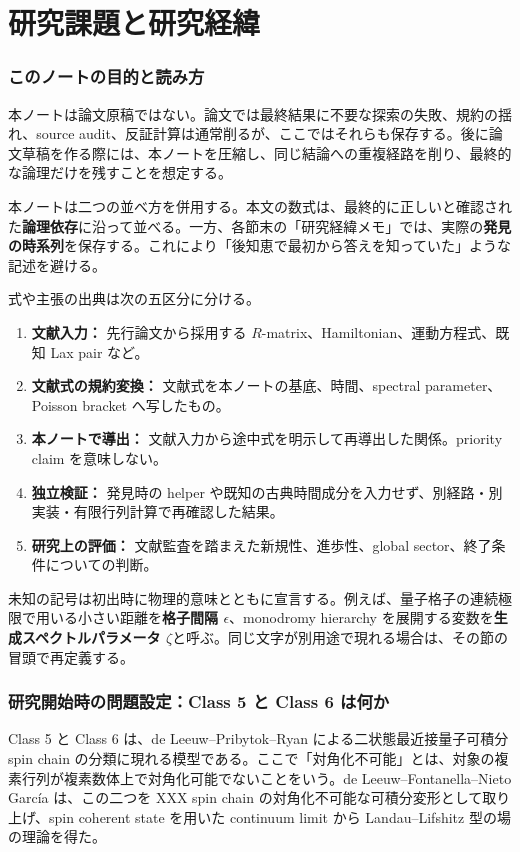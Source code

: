 \part{研究課題と研究経緯}

\section{このノートの目的と読み方}
\label{sec:purpose}
本ノートは論文原稿ではない。論文では最終結果に不要な探索の失敗、規約の揺れ、source audit、反証計算は通常削るが、ここではそれらも保存する。後に論文草稿を作る際には、本ノートを圧縮し、同じ結論への重複経路を削り、最終的な論理だけを残すことを想定する。

本ノートは二つの並べ方を併用する。本文の数式は、最終的に正しいと確認された\textbf{論理依存}に沿って並べる。一方、各節末の「研究経緯メモ」では、実際の\textbf{発見の時系列}を保存する。これにより「後知恵で最初から答えを知っていた」ような記述を避ける。

式や主張の出典は次の五区分に分ける。
\begin{enumerate}[leftmargin=2.5em]
\item \textbf{文献入力：} 先行論文から採用する $R$-matrix、Hamiltonian、運動方程式、既知 Lax pair など。
\item \textbf{文献式の規約変換：} 文献式を本ノートの基底、時間、spectral parameter、Poisson bracket へ写したもの。
\item \textbf{本ノートで導出：} 文献入力から途中式を明示して再導出した関係。priority claim を意味しない。
\item \textbf{独立検証：} 発見時の helper や既知の古典時間成分を入力せず、別経路・別実装・有限行列計算で再確認した結果。
\item \textbf{研究上の評価：} 文献監査を踏まえた新規性、進歩性、global sector、終了条件についての判断。
\end{enumerate}

未知の記号は初出時に物理的意味とともに宣言する。例えば、量子格子の連続極限で用いる小さい距離を\textbf{格子間隔 $\epsilon$}、monodromy hierarchy を展開する変数を\textbf{生成スペクトルパラメータ $\zeta$}と呼ぶ。同じ文字が別用途で現れる場合は、その節の冒頭で再定義する。

\section{研究開始時の問題設定：Class 5 と Class 6 は何か}
Class 5 と Class 6 は、de Leeuw--Pribytok--Ryan による二状態最近接量子可積分 spin chain の分類に現れる模型である\cite{DPR2019}。ここで「対角化不可能」とは、対象の複素行列が複素数体上で対角化可能でないことをいう。de Leeuw--Fontanella--Nieto Garc\'ia は、この二つを XXX spin chain の対角化不可能な可積分変形として取り上げ、spin coherent state を用いた continuum limit から Landau--Lifshitz 型の場の理論を得た\cite{DFN2026}。

